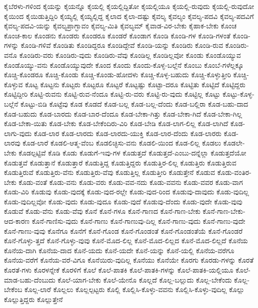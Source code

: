 {ಕೈಬೆರಳು-ಗಳಿಂದ
ಕೈಯನ್ನು
ಕೈಯನ್ನೊ
ಕೈಯಲ್ಲಿ
ಕೈಯಲ್ಲಿದ್ದಿತೋ
ಕೈಯಲ್ಲಿಯೂ
ಕೈಯಲ್ಲಿ-ರುವುದು
ಕೈಯಲ್ಲಿ-ರುವುದೋ
ಕೈಯಿಂದ
ಕೈಯಿಡುತ್ತಿದ್ದಿರಿ
ಕೈಯ್ಯಲ್ಲಿ
ಕೈಯ್ಯಲ್ಲಿದ್ದ
ಕೈಲಾದ
ಕೈಲಾ-ದಷ್ಟು
ಕೈವಲ್ಯ
ಕೈವಲ್ಯಂ
ಕೈವಲ್ಯ-ಪದವಿ
ಕೈವಲ್ಯ-ಪದವಿಗೆ
ಕೈವಲ್ಯ-ಪದವಿ-ಯನ್ನು
ಕೈವಲ್ಯಪ್ರಾಗ್ಭಾವಂ
ಕೈವಲ್ಯ-ಮಿತಿ
ಕೈವಲ್ಯಮ್
ಕೈವಾಡ-ವಿರ-ಬೇಕು
ಕೈಹಾಕ-ಬೇಕು
ಕೊಂಚ
ಕೊಂಚ-ಕಾಲ
ಕೊಂಡನು
ಕೊಂಡರು
ಕೊಂಡರೂ
ಕೊಂಡರೆ
ಕೊಂಡಾಗ
ಕೊಂಡಿ
ಕೊಂಡಿ-ಗಳ
ಕೊಂಡಿ-ಗಳಂತೆ
ಕೊಂಡಿ-ಗಳನ್ನು
ಕೊಂಡಿ-ಗಳಿವೆ
ಕೊಂಡಿತು
ಕೊಂಡಿದ್ದರೂ
ಕೊಂಡಿದ್ದೇವೆ
ಕೊಂಡಿ-ಯನ್ನು
ಕೊಂಡಿರು
ಕೊಂಡಿ-ರುವ
ಕೊಂಡಿರು-ವನೊ
ಕೊಂಡಿರು-ವರು
ಕೊಂಡಿರು-ವುದು
ಕೊಂಡಿರು-ವೆವು
ಕೊಂಡಿಲ್ಲ
ಕೊಂಡಿಲ್ಲವೋ
ಕೊಂಡು
ಕೊಂಡೊಯ್ಯುವ
ಕೊಂಡೊಯ್ಯು-ವನು
ಕೊಂಡೊಯ್ಯುವುದೇ
ಕೊಂದ
ಕೊಂದು
ಕೊಂದು-ಕೊಳ್ಳ-ಬಲ್ಲೆನೆ
ಕೊಂಬು
ಕೊಂಬೆ-ಗಳೆಲ್ಲಕ್ಕೂ
ಕೊಚ್ಚಿ-ಕೊಂಡರೂ
ಕೊಚ್ಚಿ-ಕೊಂಡು
ಕೊಚ್ಚಿ-ಕೊಂಡು-ಹೋದಳು
ಕೊಚ್ಚಿ-ಕೊಳ್ಳ-ಬಹುದು
ಕೊಚ್ಚಿ-ಕೊಳ್ಳುತ್ತೀರಿ
ಕೊಚ್ಚಿ-ಕೊಳ್ಳುವ
ಕೊಟ್ಟ
ಕೊಟ್ಟನು
ಕೊಟ್ಟರು
ಕೊಟ್ಟರೂ
ಕೊಟ್ಟರೆ
ಕೊಟ್ಟಷ್ಟು
ಕೊಟ್ಟಾ-ದರೂ
ಕೊಟ್ಟಿತು
ಕೊಟ್ಟಿದೆ
ಕೊಟ್ಟಿದ್ದರು
ಕೊಟ್ಟಿದ್ದೀರಿ
ಕೊಟ್ಟಿ-ರುವನು
ಕೊಟ್ಟಿ-ರುವ-ನೆಂದೂ
ಕೊಟ್ಟಿ-ರು-ವರು
ಕೊಟ್ಟಿ-ರು-ವುದು
ಕೊಟ್ಟಿಲ್ಲ
ಕೊಟ್ಟು
ಕೊಟ್ಟು-ಕೊಳ್ಳ-ಬಲ್ಲೆನೆ
ಕೊಟ್ಟು-ಬಿಡಿ
ಕೊಟ್ಟೆವು
ಕೊಡ
ಕೊಡದೆ
ಕೊಡ-ಬಲ್ಲ
ಕೊಡ-ಬಲ್ಲ-ದೆಂದು
ಕೊಡ-ಬಲ್ಲಿರಾ
ಕೊಡ-ಬಹು-ದಾದ
ಕೊಡ-ಬಹುದು
ಕೊಡ-ಬಾರದು
ಕೊಡ-ಬಾರ-ದೆಂದೂ
ಕೊಡ-ಬೇಕಾ-ಗಿತ್ತು
ಕೊಡ-ಬೇಕಾ-ಗಿದೆ
ಕೊಡ-ಬೇಕಾ-ಗಿಲ್ಲ
ಕೊಡ-ಬೇಕಾ-ಯಿತು
ಕೊಡ-ಬೇಕು
ಕೊಡ-ಬೇಕೆಂದಿರು-ವಿರಿ
ಕೊಡ-ಬೇಡಿ
ಕೊಡ-ಲಾಗ-ಲಿಲ್ಲ
ಕೊಡ-ಲಾಗಿದೆ
ಕೊಡ-ಲಾಗು-ವುದು
ಕೊಡ-ಲಾರ
ಕೊಡ-ಲಾರದು
ಕೊಡ-ಲಾರದು-ಯುಕ್ತಿ
ಕೊಡ-ಲಾರ-ದೆಂದು
ಕೊಡ-ಲಾರರು
ಕೊಡ-ಲಾರವು
ಕೊಡ-ಲಾರೆ
ಕೊಡಲಿ-ಆತ್ಮ-ವೆಂಬ
ಕೊಡಲಿಚ್ಛಿಸು-ವನು
ಕೊಡಲಿ-ಯಿಂದ
ಕೊಡ-ಲಿಲ್ಲ
ಕೊಡಲು
ಕೊಡಲೇ-ಬೇಕು
ಕೊಡಲ್ಪಟ್ಟಿವೆ
ಕೊಡಿ
ಕೊಡು
ಕೊಡುಗೆ-ಇವು-ಗಳ
ಕೊಡುತ್ತದೆ
ಕೊಡುತ್ತದೆ-ಎಂಬು-ದನ್ನೆಲ್ಲಾ
ಕೊಡುತ್ತದೆಯೋ
ಕೊಡುತ್ತವೆ
ಕೊಡುತ್ತಾನೆ
ಕೊಡುತ್ತಾರೆ
ಕೊಡುತ್ತಿದ್ದ
ಕೊಡುತ್ತಿದ್ದರು
ಕೊಡುತ್ತಿರ-ಲಿಲ್ಲ
ಕೊಡುತ್ತಿರು
ಕೊಡುತ್ತಿರುವ
ಕೊಡುತ್ತಿರುವೆ
ಕೊಡುತ್ತಿರು-ವೆನು
ಕೊಡುತ್ತಿರು-ವೆವು
ಕೊಡುತ್ತಿಲ್ಲ
ಕೊಡುತ್ತೀರಿ
ಕೊಡುತ್ತೇನೆ
ಕೊಡುವ
ಕೊಡು-ವಂತಿರ-ಬೇಕು
ಕೊಡು-ವಂತೆ
ಕೊಡು-ವನು
ಕೊಡು-ವರು
ಕೊಡು-ವವ-ನದು
ಕೊಡು-ವವನು
ಕೊಡು-ವವರ
ಕೊಡು-ವಾಗ
ಕೊಡು-ವಿರಿ
ಕೊಡುವು
ಕೊಡು-ವುದಕ್ಕೆ
ಕೊಡು-ವುದ-ರಲ್ಲೇ
ಕೊಡು-ವುದ-ರಿಂದ
ಕೊಡುವು-ದಾವುದು
ಕೊಡು-ವುದಿಲ್ಲ
ಕೊಡು-ವುದಿಲ್ಲವೋ
ಕೊಡು-ವುದು
ಕೊಡು-ವುದೂ
ಕೊಡು-ವುದೆ
ಕೊಡುವು-ದೆಂದು
ಕೊಡು-ವುದೇ
ಕೊಡು-ವುವು
ಕೊಡುವೆ
ಕೊಡು-ವೆನು
ಕೊಡು-ವೆವು
ಕೊನೆ
ಕೊನೆ-ಗಳೂ
ಕೊನೆ-ಗಾಣದ
ಕೊನೆ-ಗಾಣ-ಬೇಕು
ಕೊನೆ-ಗಾಣ-ಬೇಕು-ಆದ-ಕಾರಣ
ಕೊನೆ-ಗಾಣಿಸು-ವುದು
ಕೊನೆ-ಗಾಣು
ಕೊನೆ-ಗಾಣುವು-ದಿಲ್ಲ
ಕೊನೆ-ಗಾಣು-ವುದು
ಕೊನೆ-ಗಾಣು-ವುದೇ
ಕೊನೆ-ಗಾಣು-ವುವು
ಕೊನೆಗೂ
ಕೊನೆಗೆ
ಕೊನೆ-ಗೊಂಡ
ಕೊನೆ-ಗೊಂಡಂತೆ
ಕೊನೆ-ಗೊಂಡಂತೆಯೆ
ಕೊನೆ-ಗೊಂಡರೆ
ಕೊನೆ-ಗೊಳ್ಳು-ತ್ತದೆ
ಕೊನೆ-ಗೊಳ್ಳು-ವುವು
ಕೊನೆ-ಮೊದ-ಲಿಲ್ಲ
ಕೊನೆ-ಮೊದ-ಲಿಲ್ಲದ
ಕೊನೆ-ಮೊದ-ಲಿಲ್ಲದೆ
ಕೊನೆಯ
ಕೊನೆಯ-ದಾಗಿ
ಕೊನೆಯ-ದಾದ
ಕೊನೆ-ಯದು
ಕೊನೆ-ಯದೇ
ಕೊನೆ-ಯನ್ನು
ಕೊನೆ-ಯಲ್ಲಿ
ಕೊನೆಯ-ವರೆಗೂ
ಕೊನೆಯ-ವರೆಗೆ
ಕೊನೆಯ-ವರೆ-ವಿಗೂ
ಕೊನೆಯಿರು-ವುದಿಲ್ಲ
ಕೊನೆಯು
ಕೊನೆಯೇ
ಕೊರಗು
ಕೊರಡು-ಗಳನ್ನು
ಕೊರತೆ
ಕೊರತೆ-ಗಳು
ಕೊರಳನ್ನೇಕೆ
ಕೊರಳಿಗೆ
ಕೊಲೆ
ಕೊಲೆ-ಪಾತಕಿ
ಕೊಲೆ-ಪಾತಕಿ-ಗಳನ್ನು
ಕೊಲೆ-ಪಾತಕಿ-ಯಲ್ಲಿಯೂ
ಕೊಲೆ-ಮಾಡ-ಬಹು-ದೆಂಬುದು
ಕೊಲೆ-ಯಾಗ-ಬೇಕು
ಕೊಲೆ-ಯೇನೊ
ಕೊಲ್ಲದೆ
ಕೊಲ್ಲ-ಬಲ್ಲುದು
ಕೊಲ್ಲ-ಬೇಕೆಂದು
ಕೊಲ್ಲ-ಬೇಕೆಂಬ
ಕೊಲ್ಲ-ಲಾರೆ
ಕೊಲ್ಲಲು
ಕೊಲ್ಲಲ್ಪಟ್ಟರು
ಕೊಲ್ಲಿ
ಕೊಲ್ಲಿಸಿ-ಕೊಳ್ಳು-ವವನು
ಕೊಲ್ಲಿಸಿ-ಕೊಳ್ಳು-ವುದಿಲ್ಲ
ಕೊಲ್ಲು
ಕೊಲ್ಲುತ್ತಿದ್ದರು
ಕೊಲ್ಲುತ್ತೇನೆ
}
